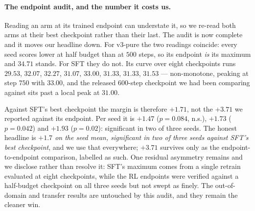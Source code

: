 \paragraph{The endpoint audit, and the number it costs us.} Reading an arm at its trained
endpoint can understate it, so we re-read both arms at their best checkpoint rather than their
last. The audit is now complete and it moves our headline down. For v3-pure the two readings
coincide: every seed scores lower at half budget than at $500$ steps, so its endpoint \emph{is}
its maximum and $34.71$ stands. For SFT they do not. Its curve over eight checkpoints runs
$29.53$, $32.07$, $32.27$, $31.07$, $33.00$, $31.33$, $31.33$, $31.53$ --- non-monotone, peaking
at step $750$ with $33.00$, and the released $600$-step checkpoint we had been comparing against
sits past a local peak at $31.00$.

Against SFT's best checkpoint the margin is therefore $+1.71$, not the $+3.71$ we reported
against its endpoint. Per seed it is $+1.47$ ($p{=}0.084$, n.s.), $+1.73$ ($p{=}0.042$) and
$+1.93$ ($p{=}0.02$): significant in two of three seeds. The honest headline is
\emph{$+1.7$ on the seed mean, significant in two of three seeds against SFT's best checkpoint},
and we use that everywhere; $+3.71$ survives only as the endpoint-to-endpoint comparison, labelled
as such. One residual asymmetry remains and we disclose rather than resolve it: SFT's maximum
comes from a single retrain evaluated at eight checkpoints, while the RL endpoints were verified
against a half-budget checkpoint on all three seeds but not swept as finely. The out-of-domain
and transfer results are untouched by this audit, and they remain the cleaner win.

